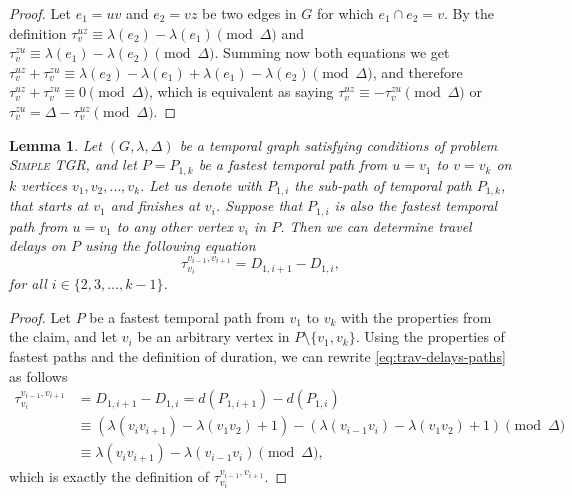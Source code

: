 \documentclass[11pt,a4paper]{article}
\newtheorem{lemma}[theorem]{Lemma}
\theoremstyle{remark}
\theoremstyle{definition}
\newcommand{\deltaExact}{\textsc{Simple TGR}}
\begin{document}
    \begin{proof}
        Let $e_1 = uv$ and $e_2 = vz$ be two edges in $G$ for which $e_1 \cap e_2 = v$. 
        By the definition $\tau_v^{uz} \equiv \lambda (e_2) - \lambda(e_1) \pmod \Delta$ and $\tau_v^{zu} \equiv \lambda (e_1) - \lambda(e_2) \pmod \Delta$.
        Summing now both equations we get $\tau_v^{uz} + \tau_v^{zu} \equiv \lambda(e_2) - \lambda(e_1) + \lambda (e_1) - \lambda(e_2) \pmod \Delta$, and therefore $\tau_v^{uz} + \tau_v^{zu} \equiv 0 \pmod \Delta$, which is equivalent as saying $\tau_v^{uz} \equiv - \tau_v^{zu} \pmod \Delta$ or $\tau_v^{zu} = \Delta - \tau_v^{uz} \pmod \Delta$.
    \end{proof}

\begin{lemma} \label{lemma:unique-fastest-path-allDelays}
    Let $(G, \lambda, \Delta)$ be a temporal graph satisfying conditions of problem \deltaExact,
    and let $P=P_{1,k}$ be a fastest temporal path from $u=v_1$ to $v=v_k$ on $k$ vertices $v_1,v_2,\dots,v_k$.
    Let us denote with $P_{1,i}$ the sub-path of temporal path $P_{1,k}$, that starts at $v_1$ and finishes at $v_i$.
    Suppose that $P_{1,i}$ is also the fastest temporal path from $u=v_1$ to any other vertex $v_i$ in $P$.
    Then we can determine travel delays on $P$ using the following equation
    \begin{equation}\label{eq:trav-delays-paths}
        \tau_{v_i}^{v_{i-1},v_{i+1}} = D_{1,i+1} - D_{1,i},
    \end{equation}
    for all $i \in \{2,3, \dots, k-1\}$.
\end{lemma}

\begin{proof}
    Let $P$ be a fastest temporal path from $v_1$ to $v_k$ with the properties from the claim, and let $v_i$ be an arbitrary vertex in $P \setminus \{v_1,v_k\}$.
    Using the properties of fastest paths and the definition of duration, we can rewrite \cref{eq:trav-delays-paths} as follows
    \begin{align*}
        \tau_{v_i}^{v_{i-1},v_{i+1}} & = D_{1,i+1} - D_{1,i} =  d(P_{1,i+1}) - d(P_{1,i}) \\
        & \equiv 
        \left(\lambda(v_{i}v_{i+1}) - \lambda(v_1v_2) + 1\right) -  
        \left(\lambda(v_{i-1}v_{i}) - \lambda(v_1v_2) + 1\right) \pmod \Delta \\
        & \equiv \lambda(v_{i}v_{i+1}) - \lambda(v_{i-1}v_{i}) \pmod \Delta,
        \end{align*}
    which is exactly the definition of $\tau_{v_i}^{v_{i-1},v_{i+1}}$.
\end{proof}
\end{document}
